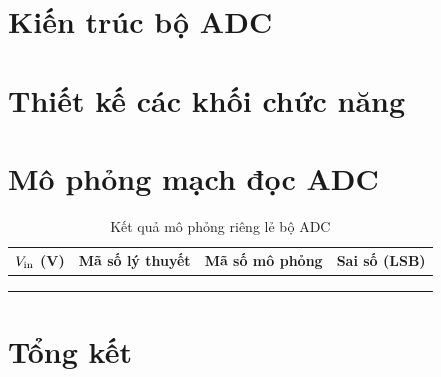 \section{Kiến trúc bộ ADC}
\label{sec:c5:kien-truc}


\section{Thiết kế các khối chức năng}
\label{sec:c5:thiet-ke}


\section{Mô phỏng mạch đọc ADC}
\label{sec:c5:mo-phong}


\begin{table}[H]
    \centering
    \caption{Kết quả mô phỏng riêng lẻ bộ ADC}
    \label{tab:c5:ket-qua-adc}
    \renewcommand{\arraystretch}{1.3}
    \begin{tabular}{|c|c|c|c|}
        \hline
        \textbf{$V_{\mathrm{in}}$ (\unit{\volt})} & \textbf{Mã số lý thuyết} &
        \textbf{Mã số mô phỏng} & \textbf{Sai số (LSB)} \\ \hline
        \TODO{} & \TODO{} & \TODO{} & \TODO{} \\ \hline
        \TODO{} & \TODO{} & \TODO{} & \TODO{} \\ \hline
        \TODO{} & \TODO{} & \TODO{} & \TODO{} \\ \hline
    \end{tabular}
\end{table}


\section{Tổng kết}
\label{sec:c5:tong-ket}

